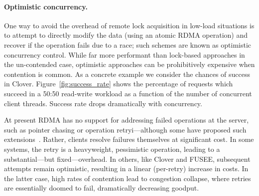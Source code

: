 \paragraph{Optimistic concurrency.}
One way to avoid the overhead of remote lock acquisition in low-load
situations is to attempt to directly modify the data (using an
atomic RDMA operation) and recover if the operation fails due to a
race; such schemes are known as optimistic concurrency control.  While
far more performant than lock-based approaches in the un-contended
case, optimistic approaches can be prohibitively expensive when
contention is common.  As a concrete example we consider the chances
of success in Clover.
Figure~\ref{fig:success_rate} shows the percentage of requests
which succeed in a 50:50 read-write workload as a function of the number of
concurrent client threads. Success rate drops dramatically with concurrency.

At present RDMA has no support for addressing failed operations at the
server, such as pointer chasing or operation retryi---although some
have proposed such extensions~\cite{rma,snap,prism}.  Rather,
clients resolve failures themselves at significant cost.
In some
systems, the retry is a heavyweight, pessimistic operation, leading to
a substantial---but fixed---overhead.  In others, like Clover and FUSEE,
subsequent attempts remain optimistic, resulting in a linear
(per-retry) increase in costs.  In the latter case,  high
rates of contention lead to congestion collapse, where retries are
essentially doomed to fail, dramatically decreasing
goodput.
%


